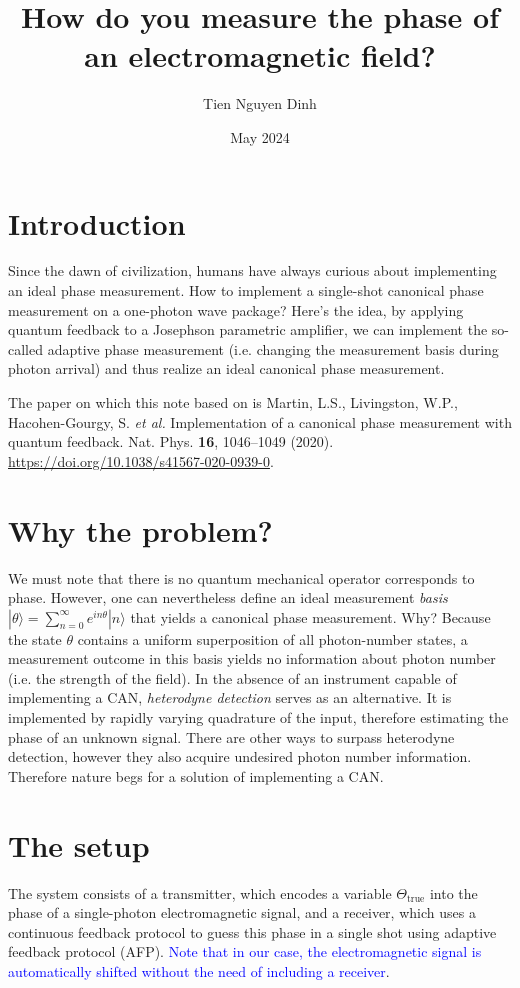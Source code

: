 \documentclass{article}
\title{How do you measure the phase of an electromagnetic field?}
\author{Tien Nguyen Dinh}
\date{May 2024}
\begin{document}
\maketitle

\section{Introduction}
Since the dawn of civilization, humans have always curious about implementing an ideal phase measurement. How to implement a single-shot canonical phase measurement on a one-photon wave package? Here's the idea, by applying quantum feedback to a Josephson parametric amplifier, we can implement the so-called adaptive phase measurement (i.e. changing the measurement basis during photon arrival) and thus realize an ideal canonical phase measurement. 

The paper on which this note based on is Martin, L.S., Livingston, W.P., Hacohen-Gourgy, S. \textit{et al.} Implementation of a canonical phase measurement with quantum feedback. Nat. Phys. \textbf{16}, 1046–1049 (2020). \href{https://doi.org/10.1038/s41567-020-0939-0}{https://doi.org/10.1038/s41567-020-0939-0}.

\section{Why the problem?}
We must note that there is no quantum mechanical operator corresponds to phase. However, one can nevertheless define an ideal measurement \textit{basis} $|\theta\rangle = \sum_{n=0}^{\infty} e^{i n \theta}|n\rangle$ that yields a canonical phase measurement. Why? Because the state $\theta$ contains a uniform superposition of all photon-number states, a measurement outcome in this basis yields no information about photon number (i.e. the strength of the field). In the absence of an instrument capable of implementing a CAN, \textit{heterodyne detection} serves as an alternative. It is implemented by rapidly varying quadrature of the input, therefore estimating the phase of an unknown signal. There are other ways to surpass heterodyne detection, however they also acquire undesired photon number information. Therefore nature begs for a solution of implementing a CAN.

\section{The setup}
The system consists of a transmitter, which encodes a variable $\Theta_{\text{true}}$ into the phase of a single-photon electromagnetic signal, and a receiver, which uses a continuous feedback protocol to guess this phase in a single shot using adaptive feedback protocol (AFP). \textcolor{blue}{Note that in our case, the electromagnetic signal is automatically shifted without the need of including a receiver}.
\end{document}
